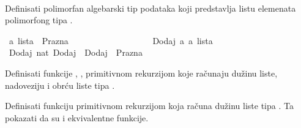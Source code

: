 \begin{isabellebody}
\begin{exercise}[subtitle=Sumiranje nizova preko listi.]
\ \ %
\isadelimproof
%
\endisadelimproof
%
\isatagproof
%
\endisatagproof
{\isafoldproof}%
%
\isadelimproof
%
\endisadelimproof
%
\end{exercise}
%
\begin{exercise}[subtitle=Algebarski tip podataka: lista.]
%
\begin{isamarkuptext}%
Definisati polimorfan algebarski tip podataka 
      koji predstavlja listu elemenata polimorfong tipa .%
\end{isamarkuptext}\isamarkuptrue%
\isamarkupfalse%
\ {\isacharprime}{\kern0pt}a\ lista\ {\isacharequal}{\kern0pt}\ Prazna\isanewline
\ \ \ \ \ \ \ \ \ \ \ \ \ \ \ \ \ \ {\isacharbar}{\kern0pt}\ Dodaj\ {\isacharprime}{\kern0pt}a\ {\isachardoublequoteopen}{\isacharprime}{\kern0pt}a\ lista{\isachardoublequoteclose}\isanewline
\isanewline
{}\isamarkupfalse%
\ {\isachardoublequoteopen}Dodaj\ {\isacharparenleft}{\kern0pt}{}{\isacharcolon}{\kern0pt}{\isacharcolon}{\kern0pt}nat{\isacharparenright}{\kern0pt}\ {\isacharparenleft}{\kern0pt}Dodaj\ {}\ {\isacharparenleft}{\kern0pt}Dodaj\ {}\ Prazna{\isacharparenright}{\kern0pt}{\isacharparenright}{\kern0pt}{\isachardoublequoteclose}%
\begin{isamarkuptext}%
Definisati funkcije 
      , 
      ,
      primitivnom rekurzijom koje računaju
      dužinu liste, nadoveziju i obrću liste tipa .%
\end{isamarkuptext}\isamarkuptrue%
%
\begin{isamarkuptext}%
Definisati funkciju  primitivnom rekurzijom 
      koja računa dužinu liste tipa .
      Ta pokazati da su  i  ekvivalentne funkcije.%
\end{isamarkuptext}\isamarkuptrue%

\end{exercise}
\end{isabellebody}
